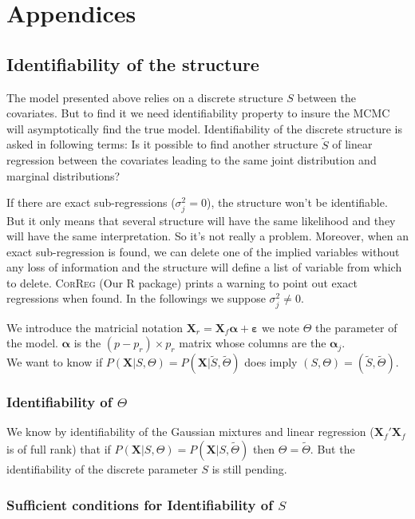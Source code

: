 \documentclass[11pt,a4paper]{article}
\begin{document}
\section{Appendices}
	\subsection{Identifiability of the structure}
	The model presented above relies on a discrete structure $S$ between the covariates. But to find it we need identifiability property to insure the MCMC will asymptotically find the true model. Identifiability of the discrete structure is asked in following terms: Is it possible to find another structure $\tilde{S}$ of linear regression between the covariates leading to the same joint distribution and marginal distributions? 
	
		If there are exact sub-regressions ($\sigma^2_j=0$), the structure won't be identifiable. But it only means that several structure will have the same likelihood and they will have the same interpretation. So it's not really a problem. Moreover, when an exact sub-regression is found, we can delete one of the implied variables without any loss of information and the structure will define a list of variable from which to delete. \textsc{CorReg} (Our R package) prints a warning to point out exact regressions when found.
	In the followings we suppose $\sigma^2_j\neq 0$.
	
	We introduce the matricial notation
		$\boldsymbol{X}_r=\boldsymbol{X}_f\boldsymbol{\alpha} + \boldsymbol{\varepsilon}$
		we note $\Theta$ the parameter of the model. $\boldsymbol{\alpha}$ is the $(p-p_r)\times p_r$ matrix whose columns are the $\boldsymbol{\alpha}_j$.
		\\ We want to know if $P(\boldsymbol{X}|S,\Theta)=P(\boldsymbol{X}|\tilde{S},\tilde{\Theta})$ does imply $(S,\Theta)=(\tilde{S},\tilde{\Theta})$.
		
	\subsubsection{Identifiability of $\Theta$}		
		We know by identifiability of the Gaussian mixtures and linear regression ($\boldsymbol{X}_f'\boldsymbol{X}_f$ is of full rank) that if $P(\boldsymbol{X}|S,\Theta)=P(\boldsymbol{X}|S,\tilde{\Theta})$ then $\Theta=\tilde{\Theta}$. But the identifiability of the discrete parameter $S$ is still pending.
		
	\subsubsection{Sufficient conditions for Identifiability of $S$}
	
\end{document}

